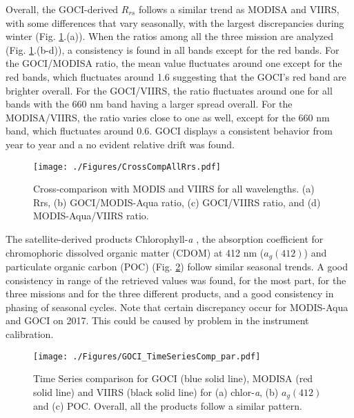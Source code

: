 \documentclass[10pt]{article}
\begin{document}
Overall, the GOCI-derived $R_{rs}$ follows a similar trend as MODISA and VIIRS, with some differences that vary seasonally, with the largest discrepancies during winter (Fig. \ref{fig:CrossCompAllRrs}.(a)). 
When the ratios among all the three mission are analyzed (Fig. \ref{fig:CrossCompAllRrs}.(b-d)), a consistency is found in all bands except for the red bands.
For the GOCI/MODISA ratio, the mean value fluctuates around one except for the red bands, which fluctuates around 1.6 suggesting that the GOCI's red band are brighter overall. 
For the GOCI/VIIRS, the ratio fluctuates around one for all bands with the 660 nm band having a larger spread overall. 
For the MODISA/VIIRS, the ratio varies close to one as well, except for the 660 nm band, which fluctuates around 0.6. 
GOCI displays a consistent behavior from year to year and a no evident relative drift was found.
\begin{figure}[H]
  \centering
  \texttt{[image: ./Figures/CrossCompAllRrs.pdf]}
    \caption{Cross-comparison with MODIS and VIIRS for all wavelengths. (a) Rrs, (b) GOCI/MODIS-Aqua ratio, (c) GOCI/VIIRS ratio, and (d) MODIS-Aqua/VIIRS ratio. \label{fig:CrossCompAllRrs} } 
\end{figure}
The satellite-derived products Chlorophyll-{\it a} \cite{OReilly1998_Chl}, the absorption coefficient for chromophoric dissolved organic matter (CDOM) at 412 nm  ($a_g(412)$) \cite{Mannino2014} and particulate organic carbon (POC) \cite{Stramski2008} (Fig. \ref{fig:GOCI_TimeSeriesComp_par}) follow similar seasonal trends.
A good consistency in range of the retrieved values was found, for the most part, for the three missions and for the three different products, and a good consistency in phasing of seasonal cycles. Note that certain discrepancy occur for MODIS-Aqua and GOCI on 2017. This could be caused by problem in the instrument calibration.
\begin{figure}[H]
  \centering
  \texttt{[image: ./Figures/GOCI\_TimeSeriesComp\_par.pdf]}
    \caption{Time Series comparison for GOCI (blue solid line), MODISA (red solid line) and VIIRS (black solid line) for (a) chlor-{\it a}, (b) $a_g(412)$ and (c) POC. Overall, all the products follow a similar pattern. \label{fig:GOCI_TimeSeriesComp_par}} 
\end{figure}
\end{document}

